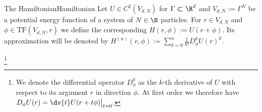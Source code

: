 \begin{mdef}{The Hamiltonian}{Hamiltonian}
    Let $U\in C^2(V_{d,N})$ for $\Gamma\relcom\R^d$ and $V_{d,N}:=\Gamma^N$ be a potential energy function of a system of $N\in\N$ particles. For $r\in V_{d,N}$ and $\phi\in\text{TF}(V_{d,N},r)$ we define the corresponding $H(r,\phi):=U(r + \phi)$. Its approximation will be denoted by $H^{(n)}(r,\phi):=\sum_{k=0}^n\frac{1}{k!} D_\phi^kU(r)^k$.
    
    \footnote{We denote the differential operator $D_\phi^k$ as the $k$-th derivative of $U$ with respect to its argument $r$ in direction $\phi$. At first order we therefore have $D_\phi U(r) = \dv{t}U(r+t\phi)\big|_{t=0}$.} 
\end{mdef}